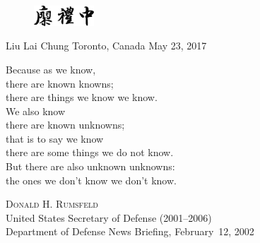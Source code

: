 \documentclass[12pt]{ut-thesis}
\begin{document}
\begin{preliminary}
\begin{acknowledgements}
        \vspace{1cm}
        \begin{figure}[h!]
          \raggedleft%
          \includegraphics[width = 0.2\textwidth]{Figures/name.pdf}
        \end{figure}
        \vspace{-0.5cm}
        \begin{flushright}
          Liu Lai Chung%
          \linebreak%
          Toronto, Canada%
          \linebreak%
          May 23, 2017
        \end{flushright}

    \end{acknowledgements}

    \cleardoublepage{}

    \newpage
    \renewcommand{\epigraphflush}{center}
    \renewcommand{\sourceflush}{flushright}
    \setlength{}
    \vspace*{\fill}
    \epigraph{
    Because as we know, \\
    there are known knowns; \\
    there are things we know we know. \\
    We also know \\
    there are known unknowns; \\
    that is to say we know \\
    there are some things we do not know. \\
    But there are also unknown unknowns: \\
    the ones we don't know we don't know.}%
    {\vspace{0.25\baselineskip}
    \textsc{Donald H. Rumsfeld} \\
    United States Secretary of Defense (2001--2006) \\
    Department of Defense News Briefing, February~12, 2002}

    \newpage
    \tableofcontents

    \listoffigures
    \listoftables


\end{preliminary}
\end{document}
